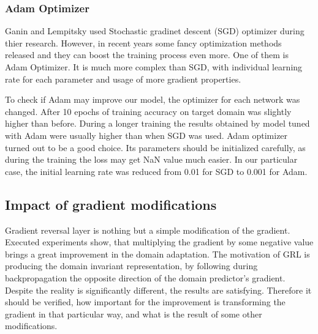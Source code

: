 \documentclass{article}
\begin{document}
\subsubsection{Adam Optimizer}
Ganin and Lempitsky used Stochastic gradinet descent (SGD) optimizer during thier research. However, in recent years some fancy optimization methods released and they can boost the training process even more. One of them is Adam Optimizer. It is much more complex than SGD, with individual learning rate for each parameter and usage of more gradient properties. 
\par
To check if Adam may improve our model, the optimizer for each network was changed. After 10 epochs of training accuracy on target domain was slightly higher than before. During a longer training the results obtained by model tuned with Adam were usually higher than when SGD was used. Adam optimizer turned out to be a good choice. Its parameters should be initialized carefully, as during the training the loss may get NaN value much easier. In our particular case, the initial learning rate was reduced from 0.01 for SGD to 0.001 for Adam.

\subsection{Impact of gradient modifications}
Gradient reversal layer is nothing but a simple modification of the gradient. Executed experiments show, that multiplying the gradient by some negative value brings a great improvement in the domain adaptation. The motivation of GRL is producing the domain invariant representation, by following during backpropagation the opposite direction of the domain predictor's gradient. Despite the reality is significantly different, the results are satisfying. Therefore it should be verified, how important for the improvement is transforming the gradient in that particular way, and what is the result of some other modifications.
\end{document}
